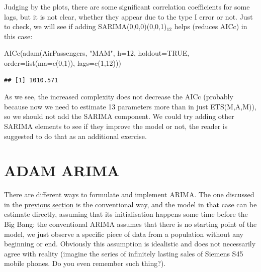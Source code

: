 \documentclass[
]{book}
\newenvironment{Shaded}{\begin{snugshade}}{\end{snugshade}}
\newcommand{\AttributeTok}[1]{\textcolor[rgb]{0.77,0.63,0.00}{#1}}
\newcommand{\ConstantTok}[1]{\textcolor[rgb]{0.00,0.00,0.00}{#1}}
\newcommand{\DecValTok}[1]{\textcolor[rgb]{0.00,0.00,0.81}{#1}}
\newcommand{\FunctionTok}[1]{\textcolor[rgb]{0.00,0.00,0.00}{#1}}
\newcommand{\NormalTok}[1]{#1}
\newcommand{\StringTok}[1]{\textcolor[rgb]{0.31,0.60,0.02}{#1}}
\theoremstyle{definition}
\theoremstyle{definition}
\theoremstyle{definition}
\theoremstyle{definition}
\theoremstyle{remark}
\begin{document}
Judging by the plots, there are some significant correlation coefficients for some lags, but it is not clear, whether they appear due to the type I error or not. Just to check, we will see if adding SARIMA(0,0,0)(0,0,1)\(_{12}\) helps (reduces AICc) in this case:

\begin{Shaded}
\begin{Highlighting}[]
\FunctionTok{AICc}\NormalTok{(}\FunctionTok{adam}\NormalTok{(AirPassengers, }\StringTok{"MAM"}\NormalTok{, }\AttributeTok{h=}\DecValTok{12}\NormalTok{, }\AttributeTok{holdout=}\ConstantTok{TRUE}\NormalTok{,}
          \AttributeTok{order=}\FunctionTok{list}\NormalTok{(}\AttributeTok{ma=}\FunctionTok{c}\NormalTok{(}\DecValTok{0}\NormalTok{,}\DecValTok{1}\NormalTok{)), }\AttributeTok{lags=}\FunctionTok{c}\NormalTok{(}\DecValTok{1}\NormalTok{,}\DecValTok{12}\NormalTok{)))}
\end{Highlighting}
\end{Shaded}

\begin{verbatim}
## [1] 1010.571
\end{verbatim}

As we see, the increased complexity does not decrease the AICc (probably because now we need to estimate 13 parameters more than in just ETS(M,A,M)), so we should not add the SARIMA component. We could try adding other SARIMA elements to see if they improve the model or not, the reader is suggested to do that as an additional exercise.

\hypertarget{ADAMARIMA}{%
\chapter{ADAM ARIMA}\label{ADAMARIMA}}

There are different ways to formulate and implement ARIMA. The one discussed in the \protect\hyperlink{ARIMA}{previous section} is the conventional way, and the model in that case can be estimate directly, assuming that its initialisation happens some time before the Big Bang: the conventional ARIMA assumes that there is no starting point of the model, we just observe a specific piece of data from a population without any beginning or end. Obviously this assumption is idealistic and does not necessarily agree with reality (imagine the series of infinitely lasting sales of Siemens S45 mobile phones. Do you even remember such thing?).
\end{document}
